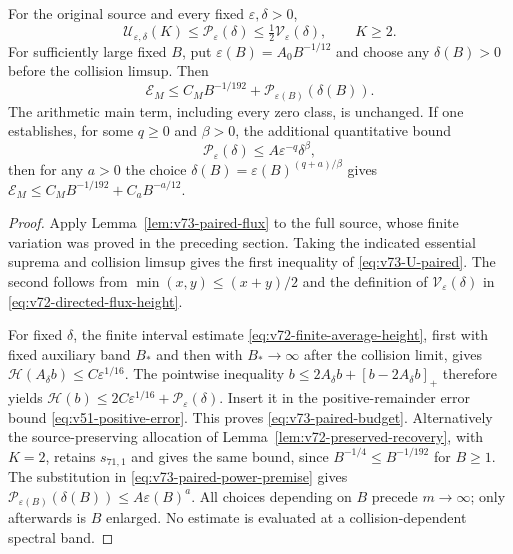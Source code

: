 \begin{theorem}
\label{thm:v73-paired-budget}
For the original source and every fixed $\varepsilon,\delta>0$,
\begin{equation}\label{eq:v73-U-paired}
 \mathcal U_{\varepsilon,\delta}(K)
       \le\mathcal P_\varepsilon(\delta)
       \le\tfrac12\mathcal V_\varepsilon(\delta),\qquad K\ge2.
\end{equation}
For sufficiently large fixed $B$, put
$\varepsilon(B)=A_0B^{-1/12}$ and choose any $\delta(B)>0$
before the collision limsup. Then
\begin{equation}\label{eq:v73-paired-budget}
 \mathcal E_M\le C_M B^{-1/192}
             +\mathcal P_{\varepsilon(B)}(\delta(B)).
\end{equation}
The arithmetic main term, including every zero class, is unchanged.
If one establishes, for some $q\ge0$ and $\beta>0$, the additional
quantitative bound
\begin{equation}\label{eq:v73-paired-power-premise}
 \mathcal P_\varepsilon(\delta)\le A\varepsilon^{-q}\delta^\beta,
\end{equation}
then for any $a>0$ the choice
$\delta(B)=\varepsilon(B)^{(q+a)/\beta}$ gives
$\mathcal E_M\le C_M B^{-1/192}+C_aB^{-a/12}$.
\end{theorem}
\begin{proof}
Apply Lemma~\ref{lem:v73-paired-flux} to the full source, whose
finite variation was proved in the preceding section. Taking the
indicated essential suprema and collision limsup gives the first
inequality of \eqref{eq:v73-U-paired}. The second follows from
$\min(x,y)\le(x+y)/2$ and the definition of
$\mathcal V_\varepsilon(\delta)$ in
\eqref{eq:v72-directed-flux-height}.

For fixed $\delta$, the finite interval estimate
\eqref{eq:v72-finite-average-height}, first with fixed auxiliary
band $B_*$ and then with $B_*\to\infty$ after the collision limit,
gives $\mathcal H(A_\delta b)\le C\varepsilon^{1/16}$.
The pointwise inequality
$b\le2A_\delta b+[b-2A_\delta b]_+$ therefore yields
$\mathcal H(b)\le2C\varepsilon^{1/16}+
\mathcal P_\varepsilon(\delta)$. Insert it in the positive-remainder
error bound \eqref{eq:v51-positive-error}. This proves
\eqref{eq:v73-paired-budget}. Alternatively the source-preserving
allocation of Lemma~\ref{lem:v72-preserved-recovery}, with $K=2$,
retains $s_{71,1}$ and gives the same bound, since
$B^{-1/4}\le B^{-1/192}$ for $B\ge1$.
The substitution in \eqref{eq:v73-paired-power-premise} gives
$\mathcal P_{\varepsilon(B)}(\delta(B))\le A\varepsilon(B)^a$.
All choices depending on $B$ precede $m\to\infty$; only afterwards
is $B$ enlarged. No estimate is evaluated at a collision-dependent
spectral band.
\end{proof}

